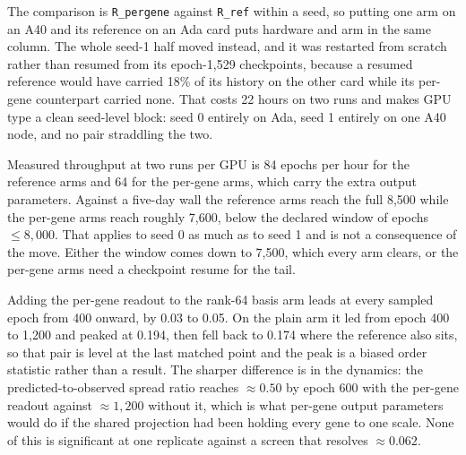  The
comparison is \texttt{R\_pergene} against \texttt{R\_ref} within a seed, so putting one arm
on an A40 and its reference on an Ada card puts hardware and arm in the same column. The
whole seed-1 half moved instead, and it was restarted from scratch rather than resumed from
its epoch-1{,}529 checkpoints, because a resumed reference would have carried 18\% of its
history on the other card while its per-gene counterpart carried none. That costs 22 hours
on two runs and makes GPU type a clean seed-level block: seed 0 entirely on Ada, seed 1
entirely on one A40 node, and no pair straddling the two.

 Measured
throughput at two runs per GPU is 84 epochs per hour for the reference arms and 64 for the
per-gene arms, which carry the extra output parameters. Against a five-day wall the
reference arms reach the full 8{,}500 while the per-gene arms reach roughly 7{,}600, below
the declared window of epochs $\le 8{,}000$. That applies to seed 0 as much as to seed 1
and is not a consequence of the move. Either the window comes down to 7{,}500, which every
arm clears, or the per-gene arms need a checkpoint resume for the tail.

 Adding the per-gene
readout to the rank-64 basis arm leads at every sampled epoch from 400 onward, by 0.03 to
0.05. On the plain arm it led from epoch 400 to 1{,}200 and peaked at 0.194, then fell back
to 0.174 where the reference also sits, so that pair is level at the last matched point and
the peak is a biased order statistic rather than a result. The sharper difference is in the
dynamics: the predicted-to-observed spread ratio reaches ${\approx}0.50$ by epoch 600 with
the per-gene readout against ${\approx}1{,}200$ without it, which is what per-gene output
parameters would do if the shared projection had been holding every gene to one scale.
None of this is significant at one replicate against a screen that resolves ${\approx}0.062$.
